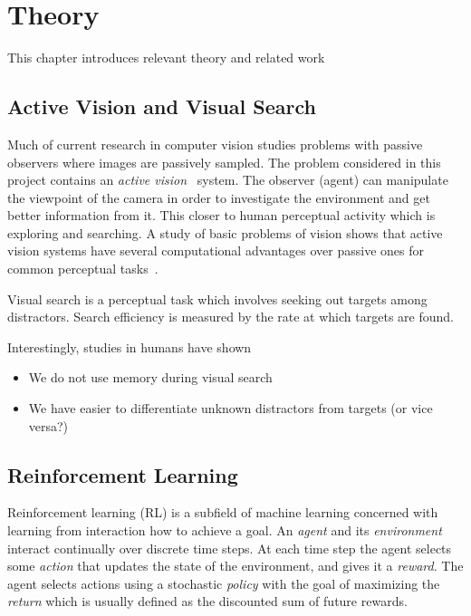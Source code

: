 \chapter{Theory}
\label{cha:theory}

This chapter introduces relevant theory and related work 

\section{Active Vision and Visual Search}

Much of current research in computer vision studies problems with passive observers where images are passively sampled. The problem considered in this project contains an \textit{active vision}~\cite{aloimonos_active_1988} system. The observer (agent) can manipulate the viewpoint of the camera in order to investigate the environment and get better information from it. This closer to human perceptual activity which is exploring and searching. A study of basic problems of vision shows that active vision systems have several computational advantages over passive ones for common perceptual tasks~\cite{aloimonos_active_1988}. %

Visual search is a perceptual task which involves seeking out targets among distractors. Search efficiency is measured by the rate at which targets are found.

Interestingly, studies in humans have shown

\begin{itemize}
    \item We do not use memory during visual search
    \item We have easier to differentiate unknown distractors from targets (or vice versa?) 
\end{itemize}


\section{Reinforcement Learning}

Reinforcement learning (RL) is a subfield of machine learning concerned with learning from interaction how to achieve a goal. An \textit{agent} and its \textit{environment} interact continually over discrete time steps. At each time step the agent selects some \textit{action} that updates the state of the environment, and gives it a \textit{reward}. The agent selects actions using a stochastic \textit{policy} with the goal of maximizing the \textit{return} which is usually defined as the discounted sum of future rewards.


